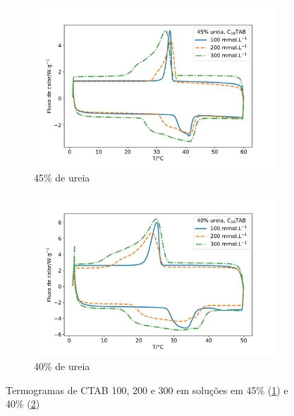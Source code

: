 		\begin{figure}[h]
			\begin{subfigure}[h]{0.45\textwidth}
				\centering
				\includegraphics[width=\textwidth]{./imagens/dsc/CTAB_45p}
				\caption{45\% de ureia}
				\label{fig:DSC_CTAB_UR45}
			\end{subfigure} \qquad %
			\begin{subfigure}[h]{0.45\textwidth}
				\centering
				\includegraphics[width=\textwidth]{./imagens/dsc/CTAB_40p}
				\caption{40\% de ureia}
				\label{fig:DSC_CTAB_UR40}
			\end{subfigure}
			\caption{Termogramas de CTAB 100, 200 e 300 \mM{} em soluções em 45\% (\ref{fig:DSC_CTAB_UR45}) e 40\% (\ref{fig:DSC_CTAB_UR40})}
			\label{fig:DSC_CTAB_UR40-45}
		\end{figure}
	
